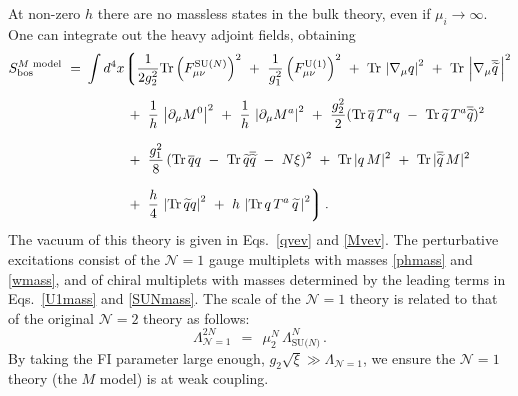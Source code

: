 \documentclass[12pt]{article}
\def\beq{\begin{equation}}
\def\eeq{\end{equation}}
\def\Tr{{\rm Tr}}
\newcommand{\ntwo}{${\mathcal N}=2$ }
\newcommand{\none}{${\mathcal N}=1$ }
\newcommand{\p}{\partial}
\newcommand{\wt}{\widetilde}
\newcommand{\ov}{\overline}
\newcommand{\mc}[1]{\mathcal{#1}}
\begin{document}
	At non-zero $ h $ there are no massless states in the bulk theory, even
	if $ \mu_i \to \infty $.
	One can integrate out the heavy adjoint fields, obtaining
\begin{align}
\label{mmodel}
%
\notag
	S_{\rm bos}^\text{$M$ model} ~=~ & \int d^4 x 
		\biggl\lgroup
			\frac{1}{2g_2^2}\Tr \left(F_{\mu\nu}^\text{SU($N$)}\right)^2  ~+~
			\frac{1}{g_1^2} \left(F_{\mu\nu}^{\rm U(1)}\right)^2 ~+~ 
			\Tr\, \left| \nabla_\mu q \right|^2 ~+~ \Tr\,\left|\nabla_\mu \ov{\wt{q}}\, \right|^2 
			\\[2mm]
%
		&
\notag
			\phantom{\int d^4 x}
			~+~
			\frac{1}{h}\, \left| \p_\mu M^0 \right|^2  ~+~
			\frac{1}{h}\, \left| \p_\mu M^a \right|^2 ~+~
			\frac{g_2^2}{2} ( \Tr\, \ov{q}\, T^a q 
					~-~ \Tr\, \wt{q}\, T^a \ov{\wt{q}} )^2 
			\\[2mm]
%
\notag
		&
			\phantom{\int d^4 x}
			~+~
			\frac{g_1^2}{8}\, (\Tr\, \ov{q} q ~-~ \Tr\, \wt{q} \ov{\wt{q}} ~-~ N\xi )^2
			~+~
			\Tr\, |q\,M|^2 ~+~ \Tr\, |\ov{\wt{q}}\, M |^2
			\\[2mm]
%
		&
			\phantom{\int d^4 x}
			~+~
			\frac{h}{4}\, \left| \Tr\, \wt{q}q \right|^2  ~+~ 
			h\,\left| \Tr\, q\,T^a\,\wt{q} \,\right|^2
			\biggr\rgroup\,.	
\end{align}
	The vacuum of this theory is given in Eqs.~\eqref{qvev} and \eqref{Mvev}.
	The perturbative excitations consist of the \none gauge multiplets with masses
	\eqref{phmass} and \eqref{wmass}, and of chiral multiplets with masses determined by the 
	leading terms in Eqs.~\eqref{U1mass} and \eqref{SUNmass}.
	The scale of the \none theory is related to that of the original \ntwo theory as follows:
\beq
	\Lambda_{\mc{N}=1}^{2N} ~~=~~ \mu_2^N\, \Lambda^N_\text{SU($N$)}\,.
\label{Lambda}
\eeq
	By taking the FI parameter large enough, 
	$ g_2\sqrt{\xi} \gg \Lambda_{\mc{N}=1} $,
	we ensure the \none theory (the $M$ model) is at
	weak coupling.
	
\end{document}
